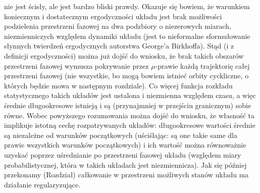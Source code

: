 \documentclass[12pt]{article}
\begin{document}
nie jest ścisły, ale jest bardzo bliski prawdy. Okazuje się bowiem, że warunkiem koniecznym i dostatecznym ergodyczności układu jest brak możliwości podzielenia przestrzeni fazowej na dwa podzbiory o niezerowych miarach, niezmienniczych względem dynamiki układu (jest to nieformalne sformułowanie słynnych twierdzeń ergodycznych autorstwa George'a Birkhoffa). Stąd (i z definicji ergodyczności) można już dojść do wniosku, że brak takich obszarów przestrzeni fazowej wymusza pokrywanie przez $ \mu $-prawie każdą trajektorię całej przestrzeni fazowej (nie wszystkie, bo mogą bowiem istnieć orbity cyckliczne, o których będzie mowa w następnym rozdziale). Co więcej funkcja rozkładu statystycznego takich układów jest ustalona i niezmienna względem czasu, a więc średnie długookresowe istnieją i są (przynajmniej w przejściu granicznym) sobie równe.  \newline 
Wobec powyższego rozumowania można dojść do wniosku, że własność ta implikuje istotną cechę rozpatrywanych układów: długookresowe wartości średnie są niezależne od warunków początkowych (uściślając: są one takie same dla prawie wszystkich warunków początkowych) i ich wartość można równoważnie uzyskać poprzez uśrednianie po przestrzeni fazowej układu (względem miary probabilistycznej, która w takich układach jest niezmiennicza). Jak się później przekonamy (Rozdział) całkowanie w przestrzeni możliwych stanów układu ma działanie regularyzujące. 
\end{document}
